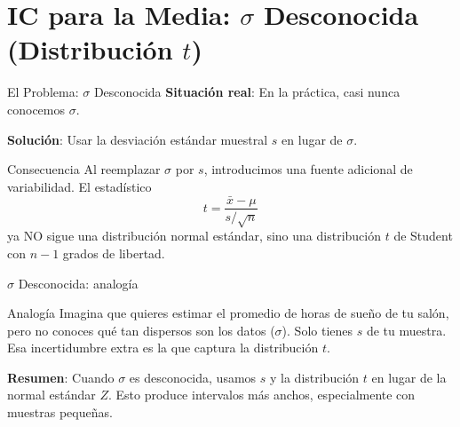 \documentclass[aspectratio=169, 11pt]{beamer}
\begin{document}
\section{IC para la Media: $\sigma$ Desconocida (Distribución $t$)}

\begin{frame}{El Problema: $\sigma$ Desconocida}
\textbf{Situaci\'on real}: En la pr\'actica, \alert{casi nunca} conocemos $\sigma$.

\vspace{0.2cm}
\textbf{Soluci\'on}: Usar la desviaci\'on est\'andar muestral $s$ en lugar de $\sigma$.

\vspace{0.2cm}
\begin{block}{Consecuencia}
Al reemplazar $\sigma$ por $s$, introducimos una fuente adicional de variabilidad. El estad\'istico
\[
t = \frac{\bar{x} - \mu}{s/\sqrt{n}}
\]
ya NO sigue una distribuci\'on normal est\'andar, sino una \alert{distribuci\'on $t$ de Student} con $n-1$ grados de libertad.
\end{block}
\end{frame}

\begin{frame}{$\sigma$ Desconocida: analog\'ia}
\begin{exampleblock}{Analog\'ia}
Imagina que quieres estimar el promedio de horas de sue\~no de tu sal\'on, pero no conoces qu\'e tan dispersos son los datos ($\sigma$). Solo tienes $s$ de tu muestra. Esa incertidumbre extra es la que captura la distribuci\'on $t$.
\end{exampleblock}

\vspace{0.5em}
\textbf{Resumen}: Cuando $\sigma$ es desconocida, usamos $s$ y la distribuci\'on $t$ en lugar de la normal est\'andar $Z$. Esto produce intervalos m\'as anchos, especialmente con muestras peque\~nas.
\end{frame}
\end{document}
